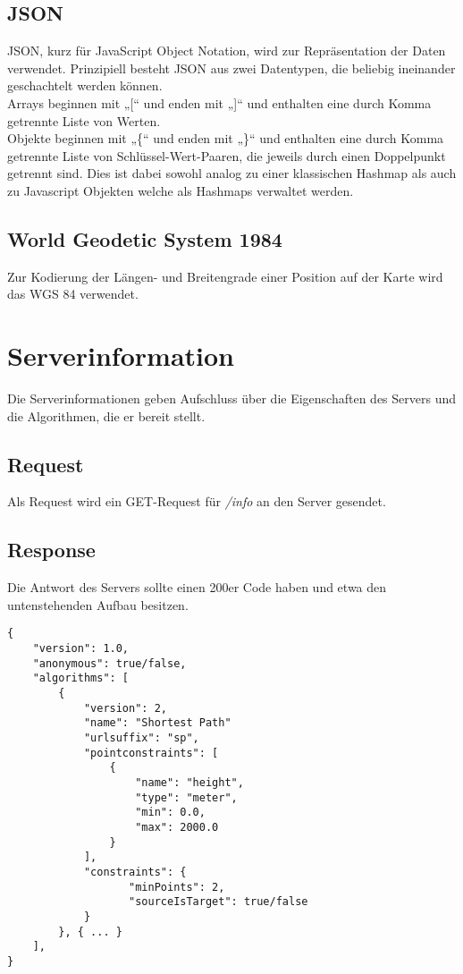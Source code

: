 \documentclass[ngerman,titlepage]{scrartcl}
\begin{document}
	\subsection{JSON}
	 
	JSON, kurz für JavaScript Object Notation, wird zur Repräsentation der Daten verwendet.
	Prinzipiell besteht JSON aus zwei Datentypen, die beliebig ineinander geschachtelt werden können. \\
	Arrays beginnen mit „[“ und enden mit „]“ und enthalten eine durch Komma getrennte Liste von Werten. \\
	Objekte beginnen mit „\{“ und enden mit „\}“ und enthalten eine durch Komma getrennte Liste von Schlüssel-Wert-Paaren, die jeweils durch einen Doppelpunkt getrennt sind.
	Dies ist dabei sowohl analog zu einer klassischen Hashmap als auch zu Javascript Objekten welche als Hashmaps verwaltet werden.
	
	\subsection{World Geodetic System 1984}
	
	Zur Kodierung der Längen- und Breitengrade einer Position auf der Karte wird das WGS 84 verwendet.

\section{Serverinformation}

	Die Serverinformationen geben Aufschluss über die Eigenschaften des Servers und die Algorithmen, die er bereit stellt.

	\subsection*{Request}
	
	Als Request wird ein GET-Request für \textit{/info} an den Server gesendet.
	
	\subsection*{Response}
	
	Die Antwort des Servers sollte einen 200er Code haben und etwa den untenstehenden Aufbau besitzen.
	
	\begin{lstlisting}
{
    "version": 1.0,
    "anonymous": true/false,
    "algorithms": [
        {
            "version": 2,
            "name": "Shortest Path"
            "urlsuffix": "sp",
            "pointconstraints": [                    
                {
                    "name": "height",
                    "type": "meter",
                    "min": 0.0,
                    "max": 2000.0
                }
            ],
            "constraints": {
                   "minPoints": 2,
                   "sourceIsTarget": true/false 
            }
        }, { ... }
    ],
}
    \end{lstlisting}
    
\end{document}

